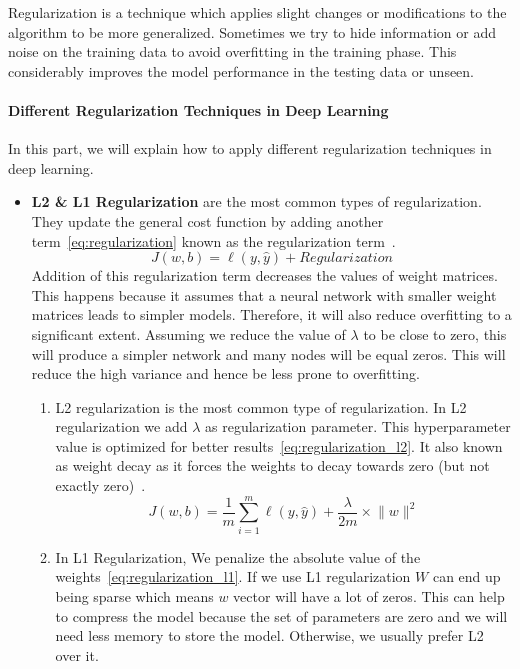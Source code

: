 Regularization is a technique which applies slight changes or modifications to the algorithm to be more generalized. Sometimes we try to hide information or add noise on the training data to avoid overfitting in the training phase. This considerably improves the model performance in the testing data or unseen.

\paragraph{Different Regularization Techniques in Deep Learning}

In this part, we will explain how to apply different regularization techniques in deep learning.

\begin{itemize}
\item \textbf{L2 \& L1 Regularization} are the most common types of regularization. They update the general cost function by adding another term~\eqref{eq:regularization} known as the regularization term~\cite{Web_Analyticsvidhya_Regularization}.
\begin{equation}\label{eq:regularization}
J(w,b) = \ell(y,\widehat{y}) + Regularization
\end{equation}
%
Addition of this regularization term decreases the values of weight matrices. This happens because it assumes that a neural network with smaller weight matrices leads to simpler models. Therefore, it will also reduce overfitting to a significant extent. Assuming we reduce the value of $\lambda$ to be close to zero, this will produce a simpler network and many nodes will be equal zeros. This will reduce the high variance  and hence be less prone to overfitting.%
\begin{enumerate}
\item L2 regularization is the most common type of regularization. In L2 regularization we add $\lambda$ as regularization parameter. This  hyperparameter value is optimized for better results~\eqref{eq:regularization_l2}. It also known as weight decay as it forces the weights to decay towards zero (but not exactly zero)~\cite{Web_Analyticsvidhya_Regularization}.%
\begin{equation}\label{eq:regularization_l2}
J(w,b) = \frac{1}{m} \sum_{i=1}^{m} \ell(y,\widehat{y})+\frac{\lambda}{2m} \times \lVert w \rVert^2
\end{equation}%
\item In L1 Regularization, We penalize the absolute value of the weights~\eqref{eq:regularization_l1}. If we use L1 regularization $W$ can end up being sparse which means $w$ vector will have a lot of zeros. This can help to compress the model because the set of parameters are zero and we will need less memory to store the model. Otherwise, we usually prefer L2 over it.%

\end{enumerate}
\end{itemize}
